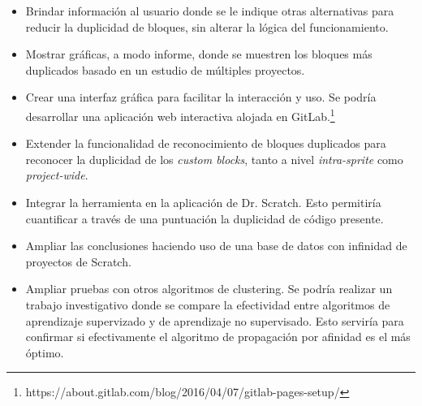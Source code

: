 \documentclass[a4paper, 12pt]{book}
\begin{document}
\begin{itemize}
\item Brindar información al usuario donde se le indique otras alternativas para reducir la duplicidad de bloques, sin alterar la lógica del funcionamiento.
\item Mostrar gráficas, a modo informe, donde se muestren los bloques más duplicados basado en un estudio de múltiples proyectos.
\item Crear una interfaz gráfica para facilitar la interacción y uso. Se podría desarrollar una aplicación web interactiva alojada en GitLab.\footnote{https://about.gitlab.com/blog/2016/04/07/gitlab-pages-setup/}
\item Extender la funcionalidad de reconocimiento de bloques duplicados para reconocer la duplicidad de los \textit{custom blocks}, tanto a nivel \textit{intra-sprite} como \textit{project-wide}.
\item Integrar la herramienta en la aplicación de Dr. Scratch. Esto permitiría cuantificar a través de una puntuación la duplicidad de código presente.
\item Ampliar las conclusiones haciendo uso de una base de datos con infinidad de proyectos de Scratch.
\item Ampliar pruebas con otros algoritmos de clustering. Se podría realizar un trabajo investigativo donde se compare la efectividad entre algoritmos de aprendizaje supervizado y de aprendizaje no supervisado. Esto serviría para confirmar si efectivamente el algoritmo de propagación por afinidad es el más óptimo.
\end{itemize}





\cleardoublepage



\end{document}
